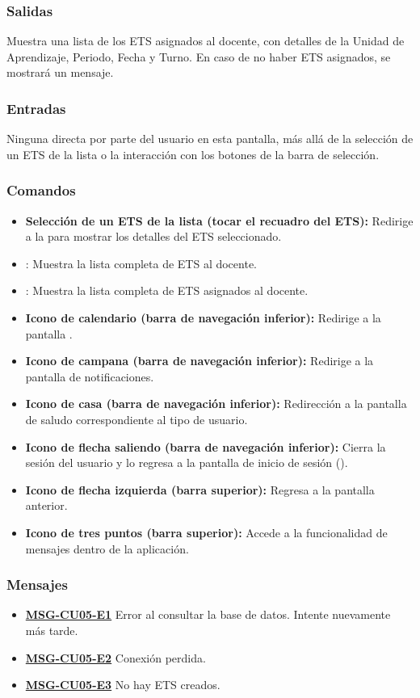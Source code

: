 \subsubsection{Salidas}
Muestra una lista de los ETS asignados al docente, con detalles de la Unidad de Aprendizaje, Periodo, Fecha y Turno. En caso de no haber ETS asignados, se mostrará un mensaje.

\subsubsection{Entradas}
Ninguna directa por parte del usuario en esta pantalla, más allá de la selección de un ETS de la lista o la interacción con los botones de la barra de selección.

\subsubsection{Comandos}
\begin{itemize}
	\item \textbf{Selección de un ETS de la lista (tocar el recuadro del ETS):} Redirige a la  para mostrar los detalles del ETS seleccionado.
	\item {}: Muestra la lista completa de ETS al docente.
	\item {}:  Muestra la lista completa de ETS asignados al docente.
	\item \textbf{Icono de calendario (barra de navegación inferior):} Redirige a la pantalla .
	\item \textbf{Icono de campana (barra de navegación inferior):} Redirige a la pantalla de notificaciones.
	\item \textbf{Icono de casa (barra de navegación inferior):} Redirección a la pantalla de saludo correspondiente al tipo de usuario.
	\item \textbf{Icono de flecha saliendo (barra de navegación inferior):} Cierra la sesión del usuario y lo regresa a la pantalla de inicio de sesión ().
	\item \textbf{Icono de flecha izquierda (barra superior):} Regresa a la pantalla anterior.
	\item \textbf{Icono de tres puntos (barra superior):} Accede a la funcionalidad de mensajes dentro de la aplicación.
\end{itemize}

\subsubsection{Mensajes}
\begin{itemize}
	\item \textbf{\hyperref[msg:CU05-E1]{MSG-CU05-E1}} Error al consultar la base de datos. Intente nuevamente más tarde.
	\item \textbf{\hyperref[msg:CU05-E2]{MSG-CU05-E2}} Conexión perdida.
	\item \textbf{\hyperref[msg:CU05-E3]{MSG-CU05-E3}} No hay ETS creados.
\end{itemize}

